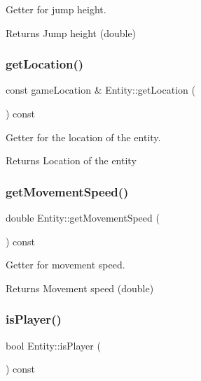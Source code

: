 Getter for jump height. 

\begin{DoxyReturn}{Returns}
Jump height (double) 
\end{DoxyReturn}
\mbox{\label{classEntity_a1096aa490b52f061d947b2cc3831266e}} 
\subsubsection{\texorpdfstring{get\+Location()}{getLocation()}}
{\footnotesize\ttfamily const game\+Location \& Entity\+::get\+Location (\begin{DoxyParamCaption}{ }\end{DoxyParamCaption}) const}



Getter for the location of the entity. 

\begin{DoxyReturn}{Returns}
Location of the entity 
\end{DoxyReturn}
\mbox{\label{classEntity_ae702b415329b0c3f382747f0a6668115}} 
\subsubsection{\texorpdfstring{get\+Movement\+Speed()}{getMovementSpeed()}}
{\footnotesize\ttfamily double Entity\+::get\+Movement\+Speed (\begin{DoxyParamCaption}{ }\end{DoxyParamCaption}) const}



Getter for movement speed. 

\begin{DoxyReturn}{Returns}
Movement speed (double) 
\end{DoxyReturn}
\mbox{\label{classEntity_a01357a3f88d3d7277cff951fa1a63add}} 
\subsubsection{\texorpdfstring{is\+Player()}{isPlayer()}}
{\footnotesize\ttfamily bool Entity\+::is\+Player (\begin{DoxyParamCaption}{ }\end{DoxyParamCaption}) const\hspace{0.3cm}{\ttfamily [virtual]}}



